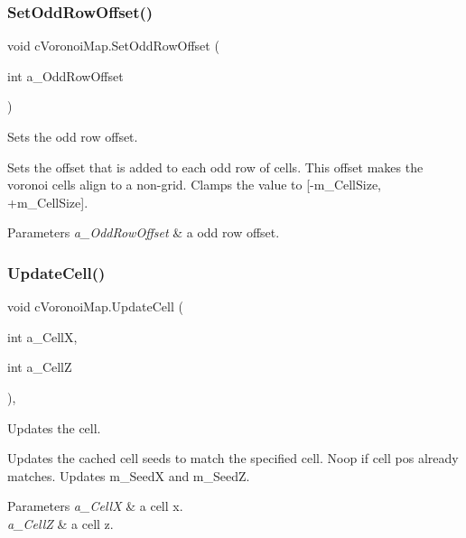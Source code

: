\subsubsection{\texorpdfstring{Set\+Odd\+Row\+Offset()}{SetOddRowOffset()}}
{\footnotesize\ttfamily void c\+Voronoi\+Map.\+Set\+Odd\+Row\+Offset (\begin{DoxyParamCaption}\item[{int}]{a\+\_\+\+Odd\+Row\+Offset }\end{DoxyParamCaption})\hspace{0.3cm}{\ttfamily [inline]}}



Sets the odd row offset. 

Sets the offset that is added to each odd row of cells. This offset makes the voronoi cells align to a non-\/grid. Clamps the value to \mbox{[}-\/m\+\_\+\+Cell\+Size, +m\+\_\+\+Cell\+Size\mbox{]}. 
\begin{DoxyParams}{Parameters}
{\em a\+\_\+\+Odd\+Row\+Offset} & a odd row offset.\\
\hline
\end{DoxyParams}
\mbox{\label{classc_voronoi_map_a39a8d8c3c8c0c4adc3d953dfc5e29b87}} 
\subsubsection{\texorpdfstring{Update\+Cell()}{UpdateCell()}}
{\footnotesize\ttfamily void c\+Voronoi\+Map.\+Update\+Cell (\begin{DoxyParamCaption}\item[{int}]{a\+\_\+\+CellX,  }\item[{int}]{a\+\_\+\+CellZ }\end{DoxyParamCaption})\hspace{0.3cm}{\ttfamily [inline]}, {\ttfamily [protected]}}



Updates the cell. 

Updates the cached cell seeds to match the specified cell. Noop if cell pos already matches. Updates m\+\_\+\+SeedX and m\+\_\+\+SeedZ. 
\begin{DoxyParams}{Parameters}
{\em a\+\_\+\+CellX} & a cell x.\\
\hline
{\em a\+\_\+\+CellZ} & a cell z.\\
\hline
\end{DoxyParams}


